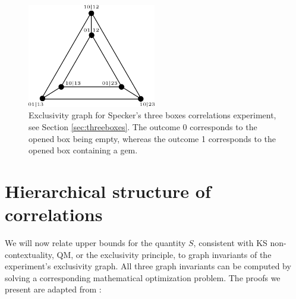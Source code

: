 \begin{figure}
    \centering
    \includegraphics[width=0.5\textwidth]{images/3boxesecl.png}
    \caption{Exclusivity graph for Specker's three boxes correlations experiment, see Section \ref{sec:threeboxes}. The outcome 0 corresponds to the opened box being empty, whereas the outcome 1 corresponds to the opened box containing a gem.}
    \label{fig:3boxesexcl}
\end{figure}

\section{Hierarchical structure of correlations}
\label{sec:cswhierarch}
We will now relate upper bounds for the quantity $S$, consistent with KS non-contextuality, QM, or the exclusivity principle, to graph invariants of the experiment's exclusivity graph. All three graph invariants can be computed by solving a corresponding mathematical optimization problem. The proofs we present are adapted from \cite{Cabello2014}:

